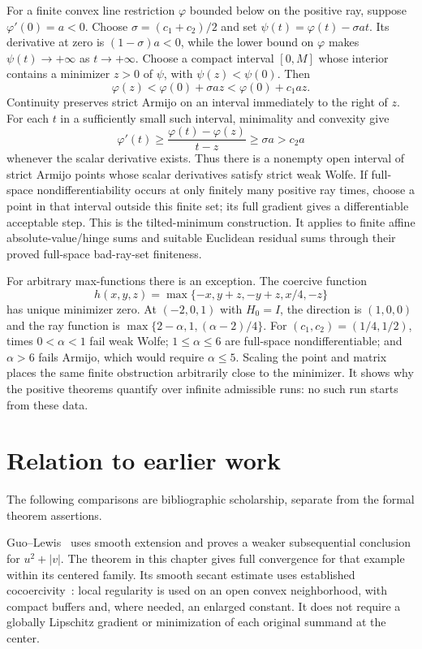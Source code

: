 For a finite convex line restriction $\varphi$ bounded below on the positive ray, suppose $\varphi'(0)=a<0$. Choose $\sigma=(c_1+c_2)/2$ and set $\psi(t)=\varphi(t)-\sigma at$. Its derivative at zero is $(1-\sigma)a<0$, while the lower bound on $\varphi$ makes $\psi(t)\to+\infty$ as $t\to+\infty$. Choose a compact interval $[0,M]$ whose interior contains a minimizer $z>0$ of $\psi$, with $\psi(z)<\psi(0)$. Then
\[
 \varphi(z)<\varphi(0)+\sigma az<\varphi(0)+c_1az.
\]
Continuity preserves strict Armijo on an interval immediately to the right of $z$. For each $t$ in a sufficiently small such interval, minimality and convexity give
\[
 \varphi'(t)\ge\frac{\varphi(t)-\varphi(z)}{t-z}\ge\sigma a>c_2a
\]
whenever the scalar derivative exists. Thus there is a nonempty open interval of strict Armijo points whose scalar derivatives satisfy strict weak Wolfe. If full-space nondifferentiability occurs at only finitely many positive ray times, choose a point in that interval outside this finite set; its full gradient gives a differentiable acceptable step. This is the tilted-minimum construction. It applies to finite affine absolute-value/hinge sums and suitable Euclidean residual sums through their proved full-space bad-ray-set finiteness.

For arbitrary max-functions there is an exception. The coercive function
\[
 h(x,y,z)=\max\{-x,y+z,-y+z,x/4,-z\}
\]
has unique minimizer zero. At $(-2,0,1)$ with $H_0=I$, the direction is $(1,0,0)$ and the ray function is $\max\{2-\alpha,1,(\alpha-2)/4\}$. For $(c_1,c_2)=(1/4,1/2)$, times $0<\alpha<1$ fail weak Wolfe; $1\le\alpha\le6$ are full-space nondifferentiable; and $\alpha>6$ fails Armijo, which would require $\alpha\le5$. Scaling the point and matrix places the same finite obstruction arbitrarily close to the minimizer. It shows why the positive theorems quantify over infinite admissible runs: no such run starts from these data.


\section*{Relation to earlier work}
The following comparisons are bibliographic scholarship, separate from the formal theorem assertions.

Guo--Lewis~\cite[Theorem~4.1 and Corollary~4.4]{GL18} uses smooth extension and proves a weaker subsequential conclusion for $u^2+|v|$. The theorem in this chapter gives full convergence for that example within its centered family. Its smooth secant estimate uses established cocoercivity~\cite[Theorem~2.5]{WW}: local regularity is used on an open convex neighborhood, with compact buffers and, where needed, an enlarged constant. It does not require a globally Lipschitz gradient or minimization of each original summand at the center.

